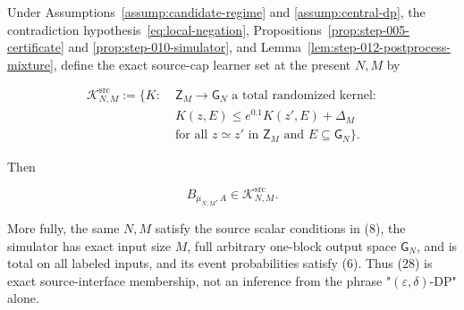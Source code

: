\begin{proposition}\label{prop:step-012-source-membership}
Under Assumptions~\ref{assump:candidate-regime} and
\ref{assump:central-dp}, the contradiction hypothesis~\eqref{eq:local-negation}, Propositions~\ref{prop:step-005-certificate} and
\ref{prop:step-010-simulator}, and
Lemma~\ref{lem:step-012-postprocess-mixture}, define the exact source-cap
learner set at the present \(N,M\) by

\[
\begin{aligned}
  \mathcal K^{\mathrm{src}}_{N,M}:=
  \bigl\{K:\;&\mathsf Z_M\longrightarrow\mathsf G_N
      \text{ a total randomized kernel}:\\[-1mm]
    &K(z,E)\le e^{0.1}K(z',E)+\Delta_M\\[-1mm]
    &\text{for all }z\simeq z'\text{ in }\mathsf Z_M
      \text{ and }E\subseteq\mathsf G_N\bigr\}.
\end{aligned}
\tag{27}
\]

Then

\[
  B_{\mu_{N,M},A}\in\mathcal K^{\mathrm{src}}_{N,M}.
\tag{28}
\]

More fully, the same \(N,M\) satisfy the source scalar conditions in
(8), the simulator has exact input size \(M\), full arbitrary one-block
output space \(\mathsf G_N\), and is total on all labeled inputs, and its
event probabilities satisfy (6).  Thus (28) is exact source-interface
membership, not an inference from the phrase
"\((\varepsilon,\delta)\)-DP" alone.
\end{proposition}

